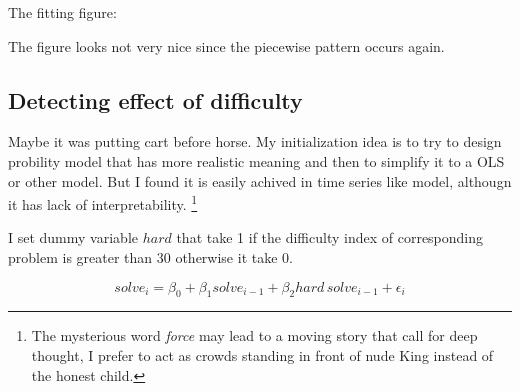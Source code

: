 \documentclass{article}
\begin{document}
The fitting figure:

\begin{figure}[h]

\centering

 
\end{figure}

The figure looks not very nice since the piecewise pattern occurs again.

\subsection{Detecting effect of difficulty}

Maybe it was putting cart before horse. My initialization idea is to try to design probility model that has more 
realistic meaning and then to simplify it to a OLS or other model. But I found it is easily achived in time series like model,
althougn it has lack of interpretability. \footnote{The mysterious word \textit{force} may lead to a moving 
story that call for deep thought, I prefer to act as crowds standing in front of nude King instead of the honest child.}

I set dummy variable $hard$ that take 1 if the difficulty index of corresponding problem is greater than 30 
otherwise it take 0.

\[
solve_i = \beta_0 + \beta_1 solve_{i-1} + \beta_2 hard \, solve_{i-1} + \epsilon_i
\]
\end{document}

